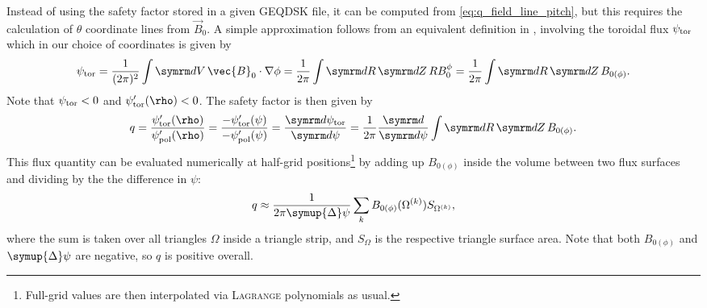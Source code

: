 Instead of using the safety factor stored in a given GEQDSK file, it can be computed from \cref{eq:q_field_line_pitch}, but this requires the calculation of $\theta$ coordinate lines from $\vec{B}_{0}$. A simple approximation follows from an equivalent definition in \textcite{dHaeseleer91}, involving the toroidal flux $\psi_{\textrm{tor}}$ which in our choice of coordinates is given by
\begin{gather}
  \psi_{\tor} = \frac{1}{(2 \pi)^{2}} \int \diff V \, \vec{B}_{0} \cdot \grad \phi = \frac{1}{2 \pi} \int \diff R \, \diff Z \, R B_{0}^{\phi} = \frac{1}{2 \pi} \int \diff R \, \diff Z \, B_{0 (\phi)}.
\end{gather}
Note that $\psi_{\textrm{tor}} < 0$ and $\psi_{\tor}' (\rho) < 0$. The safety factor is then given by
\begin{gather}
  q = \frac{\psi_{\tor}' (\rho)}{\psi_{\pol}' (\rho)} = \frac{-\psi_{\tor}' (\psi)}{-\psi_{\pol}' (\psi)} = \td[\psi_{\tor}]{\psi} = \frac{1}{2 \pi} \td{\psi} \int \diff R \, \diff Z \, B_{0 (\phi)}.
\end{gather}
This flux quantity can be evaluated numerically at half-grid positions\footnote{Full-grid values are then interpolated via \textsc{Lagrange} polynomials as usual.} by adding up $B_{0 (\phi)}$ inside the volume between two flux surfaces and dividing by the the difference in $\psi$:
\begin{gather}
  q \approx \frac{1}{2 \pi \symup{\Delta} \psi} \sum_{k} B_{0 (\phi)} (\Omega^{(k)}) S_{\Omega^{(k)}}, \label{eq:q-impl}
\end{gather}
where the sum is taken over all triangles $\Omega$ inside a triangle strip, and $S_{\Omega}$ is the respective triangle surface area. Note that both $B_{0 (\phi)}$ and $\symup{\Delta} \psi$ are negative, so $q$ is positive overall.


